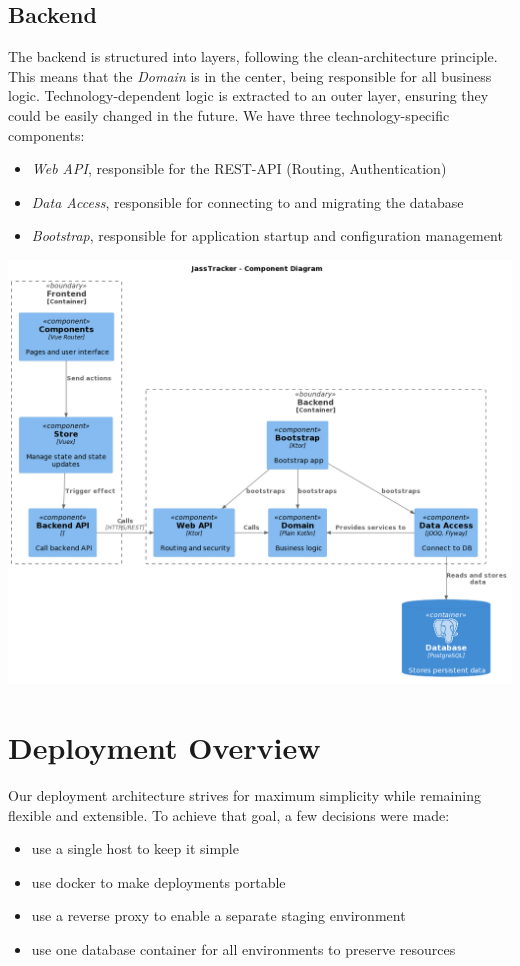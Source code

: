 \subsection{Backend}
The backend is structured into layers, following the clean-architecture principle.
This means that the \emph{Domain} is in the center, being responsible for all business logic.
Technology-dependent logic is extracted to an outer layer, ensuring they could be easily changed in the future.
We have three technology-specific components:
\begin{itemize}
    \item \emph{Web API}, responsible for the REST-API (Routing, Authentication)
    \item \emph{Data Access}, responsible for connecting to and migrating the database
    \item \emph{Bootstrap}, responsible for application startup and configuration management
\end{itemize}

\includegraphics[width=\textwidth]{resources/diagrams/c4-3-component}

\section{Deployment Overview}
Our deployment architecture strives for maximum simplicity while remaining flexible and extensible.
To achieve that goal, a few decisions were made:
\begin{itemize}
    \item use a single host to keep it simple
    \item use docker to make deployments portable
    \item use a reverse proxy to enable a separate staging environment
    \item use one database container for all environments to preserve resources
\end{itemize}

